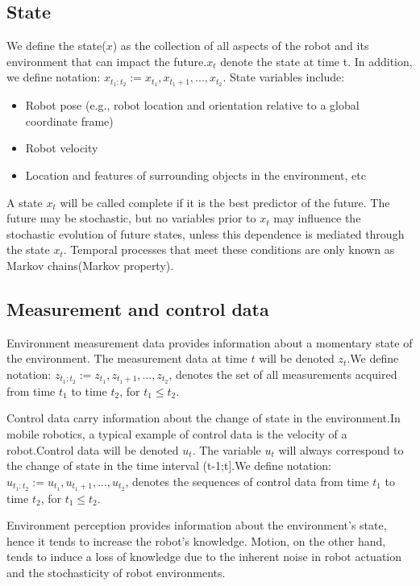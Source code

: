 \documentclass[twoside]{article}
\begin{document}
\subsection{State}
We define the state($x$) as the collection of all aspects
of the robot and its environment that can impact the future.$x_{t}$ denote the state at time t. In addition, we define notation: $x_{t_1:t_2} := x_{t_1},x_{t_1+1},...,x_{t_2}$. 
State variables include:
\begin{itemize}
  \item Robot	pose	(e.g.,	robot	location	and	orientation relative to a
global coordinate frame)
  \item Robot	velocity
  \item Location	and	features	of	surrounding	objects	in	the	environment,	etc
\end{itemize}

A state $x_{t}$ will be called complete if it is the best predictor of the future. The future may be stochastic, but no variables prior to $x_{t}$ may influence the stochastic evolution of future states, unless this dependence is mediated through the state $x_{t}$. Temporal processes that meet these conditions are only known as Markov chains(Markov property).

\subsection{Measurement and control data}
Environment measurement data provides information about a momentary state of the environment. The measurement data at time $t$ will be denoted $z_{t}$.We define notation: $z_{t_1:t_2} := z_{t_1},z_{t_1+1},...,z_{t_2}$, denotes the set of all measurements acquired from time $t_1$ to time $t_2$, for
$t_1 \leq t_2$.\par

Control data carry information about the change of state in the environment.In mobile robotics, a typical example of control data is the velocity
of a robot.Control data will be denoted $u_t$. The variable $u_t$ will always correspond to
the change of state in the time interval (t-1;t].We define notation: $u_{t_1:t_2} := u_{t_1},u_{t_1+1},...,u_{t_2}$, denotes the sequences of control data from time $t_1$ to time $t_2$, for
$t_1 \leq t_2$.\par

 Environment perception provides information about the environment’s state, hence it tends to increase the robot’s knowledge. Motion, on  the other hand, tends to induce a loss of knowledge due to the inherent noise in robot actuation and the stochasticity of robot environments.
 
\end{document}
